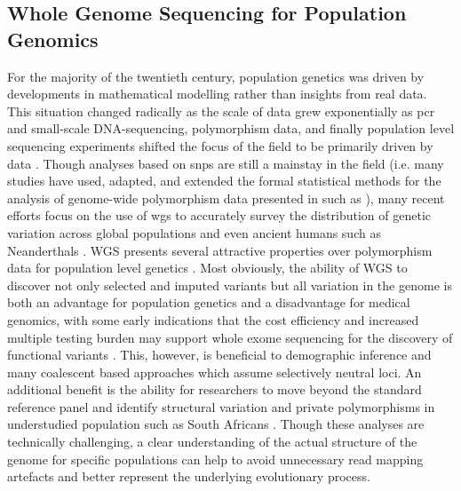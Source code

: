 \subsection{Whole Genome Sequencing for Population Genomics} \label{intro:popgen}

For the majority of the twentieth century, population genetics was driven by developments in mathematical modelling rather than insights from real data. This situation changed radically as the scale of data grew exponentially as \gls{pcr} and small-scale DNA-sequencing, polymorphism data, and finally population level sequencing experiments shifted the focus of the field to be primarily driven by data \cite{Kreitman1983,JE2010,Crawford2012}. Though analyses based on \glspl{snp} are still a mainstay in the field (i.e. many studies have used, adapted, and extended the formal statistical methods for the analysis of genome-wide polymorphism data presented in \textcite{Patterson2012a} such as \cite{Skoglund2017,Durand2011,Lipson2017,Skoglund2015,Pickrell2012,Wall2000,Nielsen2017a,Carto2009,Margaryan2020}), many recent efforts focus on the use of \gls{wgs} to accurately survey the distribution of genetic variation across global populations and even ancient humans such as Neanderthals \cite{Fan2019a,Mallick2016,Prufer2014,Bergstrom2019, Auton2015}. WGS presents several attractive properties over polymorphism data for population level genetics \cite{Hoglund2019}. Most obviously, the ability of WGS to discover not only selected and imputed variants but all variation in the genome is both an advantage for population genetics and a disadvantage for medical genomics, with some early indications that the cost efficiency and increased multiple testing burden may support whole exome sequencing for the discovery of functional variants \cite{Lacey2014}. This, however, is beneficial to demographic inference and many coalescent based approaches which assume selectively neutral loci. An additional benefit is the ability for researchers to move beyond the standard reference panel and identify structural variation and private polymorphisms in understudied population such as South Africans \cite{Choudhury2017a}. Though these analyses are technically challenging, a clear understanding of the actual structure of the genome for specific populations can help to avoid unnecessary read mapping artefacts and better represent the underlying evolutionary process. 

